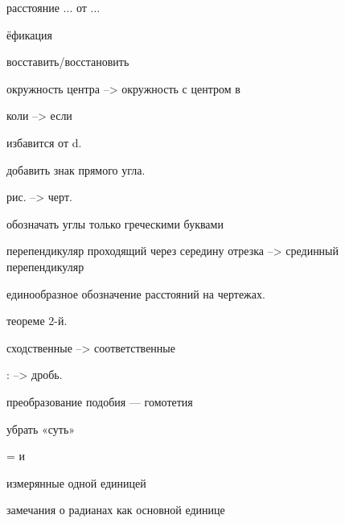 расстояние ... от ...

ёфикация

восставить/восстановить

окружность центра --> окружность с центром в

коли --> если

избавится от d.

добавить знак прямого угла.

рис. --> черт.

обозначать углы только греческими буквами

перепендикуляр проходящий через середину отрезка --> срединный перепендикуляр

единообразное обозначение расстояний на чертежах.

теореме 2-й.

сходственные --> соответственные

: --> дробь.

преобразование подобия --- гомотетия

убрать «суть»

= и \approx

измерянные одной единицей

замечания о радианах как основной единице